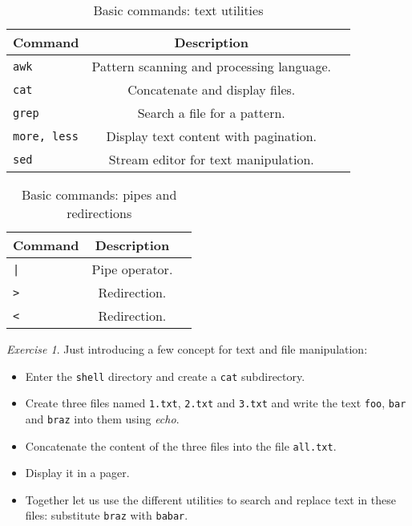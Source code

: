 \documentclass[onecolumn, oneside, a4paper, 11pt]{memoir}
\theoremstyle{remark}
\newtheorem{ex}{Exercise}
\begin{document}
\begin{table}[h!]
\centering
\caption{Basic commands: text utilities}
\begin{tabular}{|l|c|r|}
  \hline
  Command & Description \\
  \hline
  \texttt{awk} & Pattern scanning and processing language. \\
  \texttt{cat} & Concatenate and display files. \\
  \texttt{grep} & Search a file for a pattern. \\
  \texttt{more, less} & Display text content with pagination. \\
  \texttt{sed} & Stream editor for text manipulation. \\
  \hline
\end{tabular}
\end{table}

\begin{table}[h!]
\centering
\caption{Basic commands: pipes and redirections}
\begin{tabular}{|l|c|r|}
  \hline
  Command & Description \\
  \hline
  \texttt{|} & Pipe operator. \\
  \texttt{>} & Redirection. \\
  \texttt{<} & Redirection. \\
  \hline
\end{tabular}
\end{table}

\begin{ex}
Just introducing a few concept for text and file manipulation:
\begin{itemize}
\item Enter the \texttt{shell} directory and create a \texttt{cat} subdirectory.
\item Create three files named \texttt{1.txt}, \texttt{2.txt} and \texttt{3.txt} and write the text \texttt{foo}, \texttt{bar} and \texttt{braz} into them using \textit{echo}.
\item Concatenate the content of the three files into the file \texttt{all.txt}.
\item Display it in a pager.
\item Together let us use the different utilities to search and replace text in these files: substitute \texttt{braz} with \texttt{babar}.
\end{itemize}
\end{ex}
\end{document}

